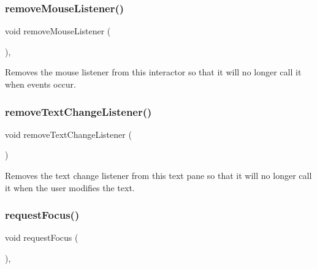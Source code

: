 \subsubsection{\texorpdfstring{remove\+Mouse\+Listener()}{removeMouseListener()}}
{\footnotesize\ttfamily void remove\+Mouse\+Listener (\begin{DoxyParamCaption}{ }\end{DoxyParamCaption})\hspace{0.3cm}{\ttfamily [virtual]}, {\ttfamily [inherited]}}



Removes the mouse listener from this interactor so that it will no longer call it when events occur. 

\mbox{\label{classGBrowserPane_a69c940b99d01eb7c353763ce4b0942a4}} 
\subsubsection{\texorpdfstring{remove\+Text\+Change\+Listener()}{removeTextChangeListener()}}
{\footnotesize\ttfamily void remove\+Text\+Change\+Listener (\begin{DoxyParamCaption}{ }\end{DoxyParamCaption})\hspace{0.3cm}{\ttfamily [virtual]}}



Removes the text change listener from this text pane so that it will no longer call it when the user modifies the text. 

\mbox{\label{classGInteractor_a519fb2ac767f8b2febbb50b898b8c8cb}} 
\subsubsection{\texorpdfstring{request\+Focus()}{requestFocus()}}
{\footnotesize\ttfamily void request\+Focus (\begin{DoxyParamCaption}{ }\end{DoxyParamCaption})\hspace{0.3cm}{\ttfamily [virtual]}, {\ttfamily [inherited]}}



